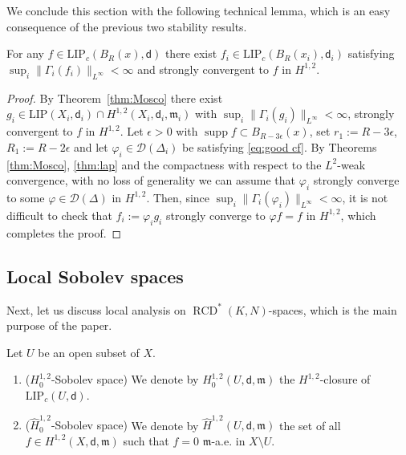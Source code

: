 \documentclass[a4paper,11pt,reqno]{article}
\numberwithin{equation}{section}
\theoremstyle{plain}
\theoremstyle{definition}
\theoremstyle{remark}
\let\altphi\phi
\let\phi\varphi
\let\varphi\altphi
\let\altphi\undefined
\DeclareMathOperator{\supp}{supp}
\newcommand{\dist}{\mathsf{d}}
\newcommand{\meas}{\mathfrak{m}}
\DeclareMathOperator{\RCD}{RCD}
\begin{document}
We conclude this section with the following technical lemma, which is an easy consequence of the previous
two stability results.

\begin{lemma}\label{lem:exist app}
For any $f \in \mathrm{LIP}_c(B_R(x), \dist)$ there exist $f_i \in \mathrm{LIP}_c(B_R(x_i), \dist_i)$ satisfying 
$\sup_i\|\Gamma_i (f_i)\|_{L^{\infty}}<\infty$ and strongly convergent to $f$ in $H^{1, 2}$. 
\end{lemma}
\begin{proof}
By Theorem~\ref{thm:Mosco} there exist $g_i \in \mathrm{LIP}(X_i, \dist_i) \cap H^{1, 2}(X_i, \dist_i, \meas_i)$ with 
$\sup_i\|\Gamma_i (g_i)\|_{L^{\infty}}<\infty$, strongly convergent to $f$ in $H^{1, 2}$.
Let $\epsilon >0$ with $\supp f \subset B_{R-3\epsilon}(x)$, set $r_1:=R-3\epsilon$, $R_1:=R-2\epsilon$ and let
$\phi_{i} \in \mathcal{D}(\Delta_i)$ be satisfying \eqref{eq:good cf}.
By Theorems \ref{thm:Mosco}, \ref{thm:lap} and the compactness with respect to the $L^2$-weak convergence, 
with no loss of generality we can assume that $\phi_{i}$ strongly converge to some $\phi \in \mathcal{D}(\Delta)$ in $H^{1, 2}$.
Then, since $\sup_i\|\Gamma_i (\phi_i)\|_{L^{\infty}}<\infty$, it is not difficult to check that $f_{i}:=\phi_ig_{i}$ strongly converge 
to $\phi f=f$ in $H^{1, 2}$, which completes the proof.
\end{proof}



\subsection{Local Sobolev spaces}

Next,  let us discuss local analysis on $\RCD^*(K, N)$-spaces, which is the main purpose of the paper.

\begin{definition}\label{def:loc sob}
Let $U$ be an open subset of $X$.
\begin{enumerate}
\item{($H^{1,2}_0$-Sobolev space)} We denote by $H^{1,2}_0(U, \dist, \meas )$ the 
$H^{1,2}$-closure of $\mathrm{LIP}_c(U, \dist)$.
\item{($\hat{H}^{1,2}_0$-Sobolev space)} We denote by $\hat{H}^{1,2}(U, \dist, \meas)$ the set of all
$f \in H^{1,2}(X,\dist,\meas)$ such that $f=0$ $\meas$-a.e. in $X\setminus U$. 
\end{enumerate}
\end{definition}
\end{document}
